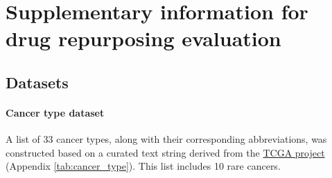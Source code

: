 \clearpage



\section{Supplementary information for drug repurposing evaluation}
\label{sec:supp_drug_repurposing}

\subsection{Datasets}
\label{sec:eval_data}

\paragraph{Cancer type dataset}
A list of 33 cancer types, along with their corresponding abbreviations, was constructed based on a curated text string derived from the \href{https://www.cancer.gov/tcga}{TCGA project} (Appendix \cref{tab:cancer_type}). This list includes 10 rare cancers.

